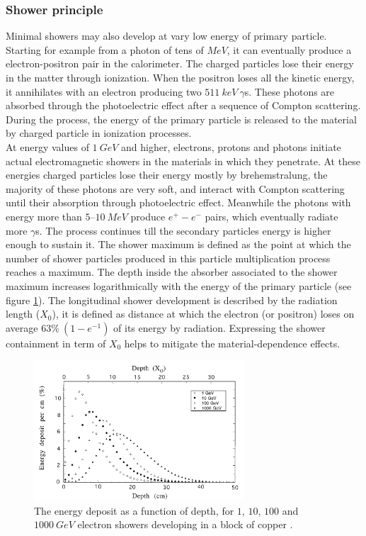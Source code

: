 \subsubsection*{Shower principle}
Minimal showers may also develop at vary low energy of primary particle. Starting for example from a photon of tens of $MeV$, it can eventually produce a electron-positron pair in the calorimeter. The  charged  particles lose their energy in the matter through ionization. When the  positron loses all the kinetic energy, it annihilates with an electron producing two $511\ keV\ \gamma$s. These photons are absorbed through the photoelectric effect after a sequence of Compton scattering. During the process, the energy of the primary particle is released to the material by charged particle in ionization processes.\\
At energy values of $1\ GeV$ and higher, electrons, protons and photons initiate actual electromagnetic showers in the materials in which they penetrate. At these energies charged particles lose their energy mostly by brehemstralung, the majority of these photons are very soft, and interact with Compton scattering until their absorption through photoelectric effect. Meanwhile the photons with energy more than $5–10\ MeV$ produce $e^+-e^-$ pairs, which eventually radiate more $\gamma$s. The process continues till the secondary particles energy is higher enough to sustain it. The shower maximum is defined as the point at which the number of shower particles produced in this particle multiplication process reaches a maximum. The depth inside the absorber associated to the shower maximum increases logarithmically with the energy of the primary particle (see figure \ref{fig:shower_max}). The longitudinal shower development is described by the radiation length ($X_0$), it is defined as distance at which the electron (or positron) loses on average $63\%\ (1-e^{-1})$ of its energy by radiation. Expressing the shower containment in term of $X_0$ helps to mitigate the material-dependence effects.

\begin{figure}
	\centering
	\includegraphics[width=0.7\textwidth]{IMG/Cap2/shower_max.png}
	\caption{The energy deposit as a function of depth, for $1$, $10$, $100$ and $1000\ GeV$ electron showers developing in a block of copper \cite{Leo}.}
	\label{fig:shower_max}
\end{figure}

